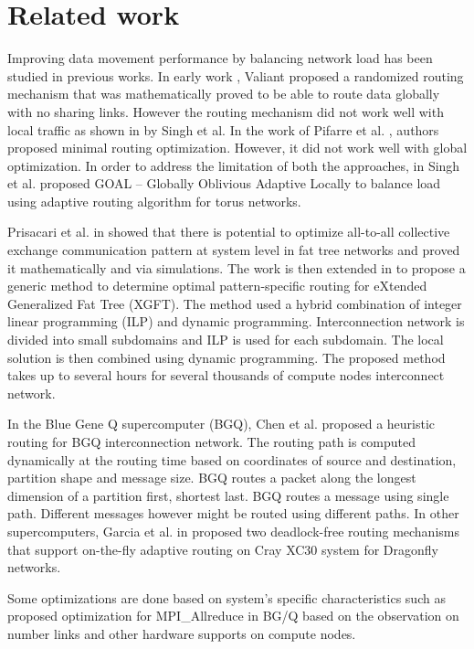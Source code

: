 \section{Related work}
\label{sec:relatedwork}

Improving data movement performance by balancing network load has been studied in previous works. In early work \cite{Valiant81:Routing}, Valiant proposed a randomized routing mechanism that was mathematically proved to be able to route data globally with no sharing links. However the routing mechanism did not work well with local traffic as shown in \cite{singh2003:GOAL} by Singh et al. In the work of Pifarre et al. \cite{Pifarre91}, authors proposed minimal routing optimization. However, it did not work well with global optimization. In order to address the limitation of both the approaches, in \cite{singh2003:GOAL} Singh et al. proposed GOAL -- Globally Oblivious Adaptive Locally to balance load using adaptive routing algorithm for torus networks. 

Prisacari et al. in \cite{Prisacari13a} showed that there is potential to optimize all-to-all collective exchange communication pattern at system level in fat tree networks and proved it mathematically and via simulations. The work is then extended in \cite{Prisacari13b} to propose a generic method to determine optimal pattern-specific routing for eXtended Generalized Fat Tree (XGFT). The method used a hybrid combination of integer linear programming (ILP) and dynamic programming. Interconnection network is divided into small subdomains and ILP is used for each subdomain. The local solution is then combined using dynamic programming. The proposed method takes up to several hours for several thousands of compute nodes interconnect network.

In the Blue Gene Q supercomputer (BGQ), Chen et al. \cite{Chen:BGQ} proposed a heuristic routing for BGQ interconnection network. The routing path is computed dynamically at the routing time based on coordinates of source and destination, partition shape and message size. BGQ routes a packet along the longest dimension of a partition first, shortest last. BGQ routes a message using single path. Different messages however might be routed using different paths. In other supercomputers, Garcia et al. in \cite{garcia2013:CrayDragonfly} proposed two deadlock-free routing mechanisms that support on-the-fly adaptive routing on Cray XC30 system for Dragonfly networks.

Some optimizations are done based on system’s specific characteristics such as \cite{Kumar:Allreduce} proposed optimization for MPI\_Allreduce in BG/Q based on the observation on number links and other hardware supports on compute nodes.

